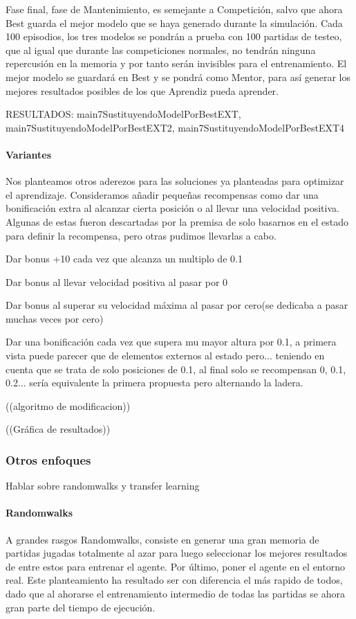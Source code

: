Fase final, fase de Mantenimiento, es semejante a Competición, salvo que ahora Best guarda el mejor modelo que se haya generado durante la simulación. Cada 100 episodios, los tres modelos se pondrán a prueba con 100 partidas de testeo, que al igual que durante las competiciones normales, no tendrán ninguna repercusión en la memoria y por tanto serán invisibles para el entrenamiento. El mejor modelo se guardará en Best y se pondrá como Mentor, para así generar los mejores resultados posibles de los que Aprendiz pueda aprender.  

RESULTADOS: 	main7SustituyendoModelPorBestEXT, main7SustituyendoModelPorBestEXT2, main7SustituyendoModelPorBestEXT4

\paragraph{Variantes}
Nos planteamos otros aderezos para las soluciones ya planteadas para optimizar el aprendizaje. 
Consideramos añadir pequeñas recompensas como dar una bonificación extra al alcanzar cierta posición o al llevar una velocidad positiva.
Algunas de estas fueron descartadas por la premisa de solo basarnos en el estado para definir la recompensa, pero otras pudimos llevarlas a cabo.

 Dar bonus +10 cada vez que alcanza un multiplo de 0.1

 Dar bonus al llevar velocidad positiva al pasar por 0

 Dar bonus al superar su velocidad máxima al pasar por cero(se dedicaba a pasar muchas veces por cero)

 Dar una bonificación cada vez que supera mu mayor altura por 0.1, a primera vista puede parecer que de elementos externos al estado pero... teniendo en cuenta que se trata de solo posiciones de 0.1, al final solo se recompensan 0, 0.1, 0.2... sería equivalente la primera propuesta pero alternando la ladera. 

((algoritmo de modificacion))

((Gráfica de resultados))

\subsubsection*{Otros enfoques}
Hablar sobre randomwalks y transfer learning

\paragraph{Randomwalks}
A grandes rasgos Randomwalks, consiste en generar una gran memoria de partidas jugadas totalmente al azar para luego seleccionar los mejores resultados de entre estos para entrenar el agente. Por último, poner el agente en el entorno real.
Este planteamiento ha resultado ser con diferencia el más rapido de todos, dado que al ahorarse el entrenamiento intermedio de todas las partidas se ahora gran parte del tiempo de ejecución.


